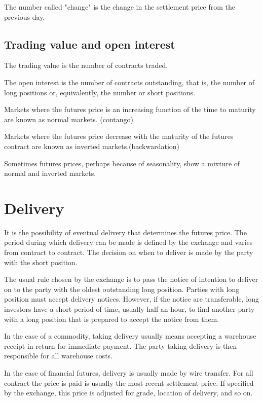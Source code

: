 \documentclass{article}
\begin{document}
The number called "change" is the change in the settlement price from the previous day.
\subsection{Trading value and open interest}
The trading value is the number of contracts traded.

The open interest is the number of contracts outstanding, that is, the number of long positions or, equivalently, the number or short positions.

Markets where the futures price is an increasing function of the time to maturity are known as normal markets. (contango)

Markets where the futures price decrease with the maturity of the futures contract are known as inverted markets.(backwardation)

Sometimes futures prices, perhaps because of seasonality, show a mixture of normal and inverted markets. 

\section{Delivery}
It is the possibility of eventual delivery that determines the futures price.
The period during which delivery can be made is defined by the exchange and varies from contract to contract. The decision on when to deliver is made by the party with the short position.

The usual rule chosen by the exchange is to pass the notice of intention to deliver on to the party with the oldest outstanding long position. Parties with long position must accept delivery notices. However, if the notice are transferable, long investors have a short period of time, usually half an hour, to find another party with a long position that is prepared to accept the notice from them.
\\ \hspace*{\fill}

In the case of a commodity, taking delivery usually means accepting a warehouse receipt in return for immediate payment. The party taking delivery is then responsible for all warehouse costs.

In the case of financial futures, delivery is usually made by wire transfer.
For all contract the price is paid is usually the most recent settlement price. If specified by the exchange, this price is adjusted for grade, location of delivery, and so on.
\\ \hspace*{\fill}
\end{document}
